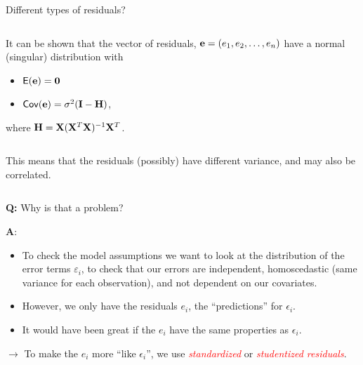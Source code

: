 \documentclass[10pt,ignorenonframetext,]{beamer}
\providecommand{\tightlist}{%
  \setlength{\itemsep}{0pt}\setlength{\parskip}{0pt}}
\begin{document}
\begin{frame}

\begin{block}{Different types of residuals?}

\(~\)

It can be shown that the vector of residuals,
\({\bf e}=(e_1,e_2,\ldots,e_n)\) have a normal (singular) distribution
with

\vspace{2mm}

\begin{itemize}
\tightlist
\item
  \(\mathsf{E}({\bf e})={\bf 0}\)
\item
  \(\mathsf{Cov}({\bf e})=\sigma^2({\bf I}-{\bf H})\),
\end{itemize}

\vspace{2mm}

where \({\bf H}={\bf X}({\bf X}^T{\bf X})^{-1}{\bf X}^T\).

\(~\)

This means that the residuals (possibly) have different variance, and
may also be correlated.

\(~\)

\textbf{Q:} Why is that a problem?

\end{block}

\end{frame}

\begin{frame}

\textbf{A}:

\begin{itemize}
\item
  To check the model assumptions we want to look at the distribution of
  the error terms \(\varepsilon_i\), to check that our errors are
  independent, homoscedastic (same variance for each observation), and
  not dependent on our covariates.
\item
  However, we only have the residuals \(e_i\), the ``predictions'' for
  \(\epsilon_i\).
\item
  It would have been great if the \(e_i\) have the same properties as
  \(\epsilon_i\).
\end{itemize}

\vspace{2mm}

\(\rightarrow\) To make the \(e_i\) more ``like \(\epsilon_i\)'', we use
\emph{\textcolor{red}{standardized}} or
\emph{\textcolor{red}{studentized residuals}}.

\end{frame}
\end{document}
